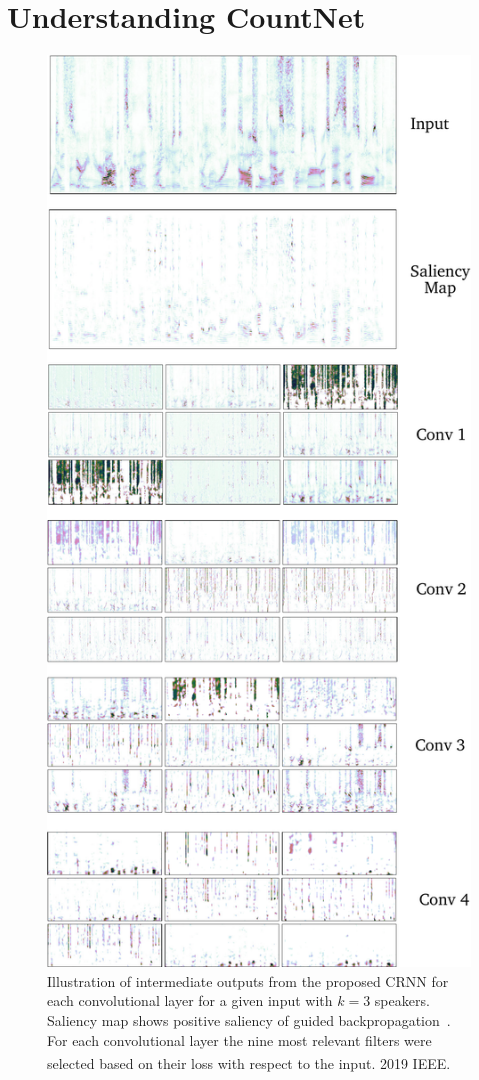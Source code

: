 \section{Understanding CountNet}%
\label{sec:ablation}
\begin{figure}[t]
  \includegraphics[width=\columnwidth, height=0.65\paperheight, keepaspectratio]{Chapters/08_Analysis_CountNet/figures/outputs.pdf}
  \caption{Illustration of intermediate outputs from the proposed CRNN for each convolutional layer for a given input with \(k=3\) speakers. Saliency map shows positive saliency of guided backpropagation~\cite{Springenberg14}. For each convolutional layer the nine most relevant filters were selected based on their loss with respect to the input. \textsuperscript{\textregistered} 2019 IEEE.}%
\label{fig:convoutputs}
\end{figure}
